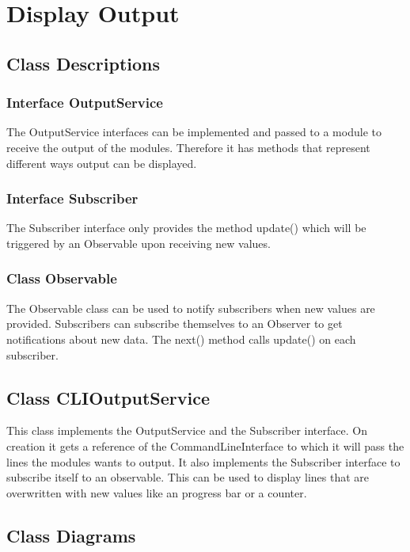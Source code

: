 \documentclass[parskip=full]{scrartcl}
\begin{document}


\section{Display Output}

\subsection{Class Descriptions}

\subsubsection{Interface OutputService}
The OutputService interfaces can be implemented and passed to a module to receive the output of the modules. 
Therefore it has methods that represent different ways output can be displayed. 

 \subsubsection{Interface Subscriber}
The Subscriber interface only provides the method update() which will be triggered by an Observable upon receiving new values.

\subsubsection{Class Observable} 
The Observable class can be used to notify subscribers when new values are provided.
Subscribers can subscribe themselves to an Observer to get notifications about new data.
The next() method calls update() on each subscriber.

\subsection{Class CLIOutputService}
This class implements the OutputService and the Subscriber interface. 
On creation it gets a reference of the CommandLineInterface to which it will pass the lines the modules wants to output.
It also implements the Subscriber interface to subscribe itself to an observable.
This can be used to display lines that are overwritten with new values like an progress bar or a counter.

\subsection{Class Diagrams}
\end{document}
